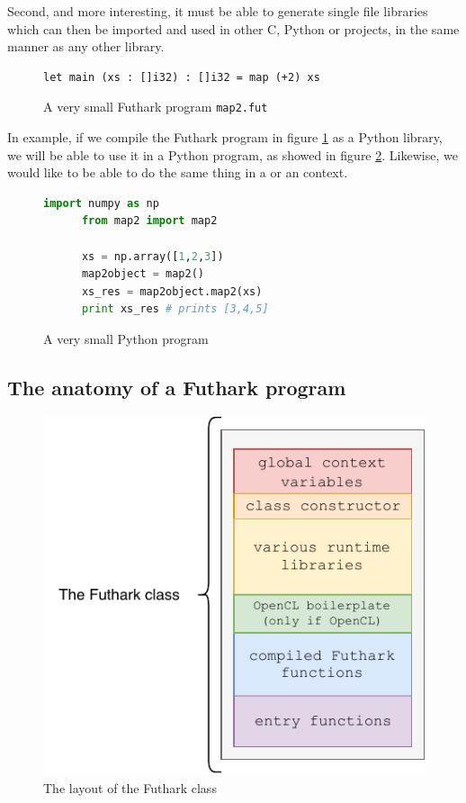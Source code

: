 Second, and more interesting, it must be able to generate single file libraries
which can then be imported and used in other C, Python or \csharp{} projects, in
the same manner as any other library.

\begin{figure}[h]
  \centering
    \begin{lstlisting}[language=Futhark]
      let main (xs : []i32) : []i32 = map (+2) xs
    \end{lstlisting}
  \caption{A very small Futhark program \texttt{map2.fut}}
  \label{fig:smallfut}
\end{figure}
In example, if we compile the Futhark program in figure \ref{fig:smallfut} as a
Python library, we will be able to use it in a Python program, as showed in figure \ref{fig:smallpython}.
Likewise, we would like to be able to do the same thing in a \csharp{} or an
\fsharp{} context.
\begin{figure}[h]
  \centering
    \begin{lstlisting}[language=python]
      import numpy as np
      from map2 import map2

      xs = np.array([1,2,3])
      map2object = map2()
      xs_res = map2object.map2(xs)
      print xs_res # prints [3,4,5]
    \end{lstlisting}
  \caption{A very small Python program}
  \label{fig:smallpython}
\end{figure}

\subsection{The anatomy of a Futhark \csharp{} program}
\begin{figure}[h]
  \centering
  \includegraphics{chapters/figs/csharp/futhark_class.pdf}
  \caption{The layout of the \csharp{} Futhark class}
  \label{fig:futharkclass}
\end{figure}

